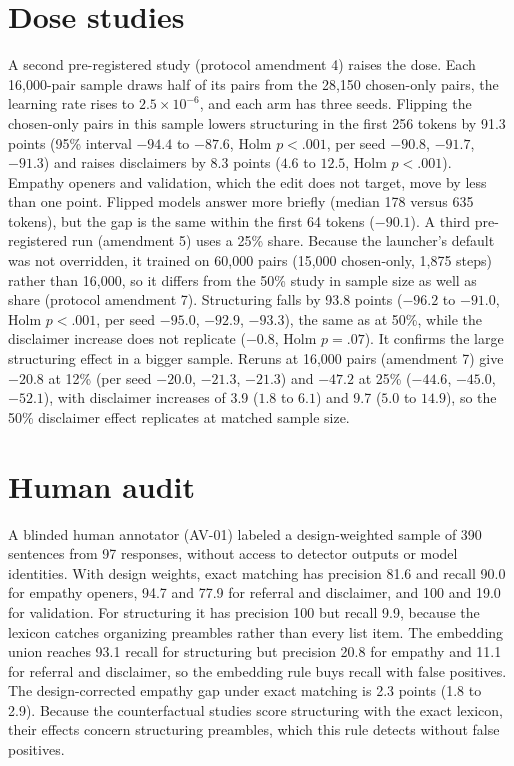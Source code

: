\documentclass[11pt]{article}
\begin{document}
\section{Dose studies}
\label{app:dose}
A second pre-registered study (protocol amendment 4) raises the dose. Each
16{,}000-pair sample draws half of its pairs from the 28{,}150 chosen-only
pairs, the learning rate rises to $2.5\times10^{-6}$, and each arm has three
seeds. Flipping the chosen-only pairs in this sample lowers structuring in
the first 256 tokens by 91.3 points (95\% interval $-94.4$ to $-87.6$,
Holm $p<.001$, per seed $-90.8$, $-91.7$, $-91.3$) and raises disclaimers
by 8.3 points ($4.6$ to $12.5$, Holm $p<.001$). Empathy openers and
validation, which the edit does not target, move by less than one point.
Flipped models answer more briefly (median 178 versus 635 tokens), but the
gap is the same within the first 64 tokens ($-90.1$).
A third pre-registered run (amendment 5) uses a 25\% share. Because the
launcher's default was not overridden, it trained on 60{,}000 pairs (15{,}000
chosen-only, 1{,}875 steps) rather than 16{,}000, so it differs from the
50\% study in sample size as well as share (protocol amendment 7). Structuring falls by 93.8 points ($-96.2$ to $-91.0$, Holm $p<.001$,
per seed $-95.0$, $-92.9$, $-93.3$), the same as at 50\%, while the
disclaimer increase does not replicate ($-0.8$, Holm $p=.07$). It
confirms the large structuring effect in a bigger sample. Reruns at
16{,}000 pairs (amendment 7) give $-20.8$ at 12\% (per seed $-20.0$,
$-21.3$, $-21.3$) and $-47.2$ at 25\% ($-44.6$, $-45.0$, $-52.1$), with
disclaimer increases of 3.9 ($1.8$ to $6.1$) and 9.7 ($5.0$ to $14.9$), so
the 50\% disclaimer effect replicates at matched sample size.

\section{Human audit}
\label{app:human-audit}
A blinded human annotator (AV-01) labeled a design-weighted sample of 390
sentences from 97 responses, without access to detector outputs or model
identities. With design weights, exact matching has precision 81.6 and
recall 90.0 for empathy openers, 94.7 and 77.9 for referral and
disclaimer, and 100 and 19.0 for validation. For structuring it has
precision 100 but recall 9.9, because the lexicon catches organizing
preambles rather than every list item. The embedding union reaches 93.1
recall for structuring but precision 20.8 for empathy and 11.1 for
referral and disclaimer, so the embedding rule buys recall with false
positives. The
design-corrected empathy gap under exact matching is 2.3 points (1.8 to
2.9). Because the counterfactual studies score structuring with the exact
lexicon, their effects concern structuring preambles, which this rule
detects without false positives.
\end{document}
